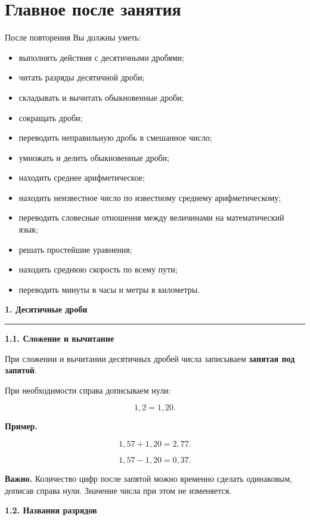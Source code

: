 \documentclass[a4paper,12pt]{article}
\newcommand{\topic}[1]{%
  \vspace{0.7em}
  {\Large\bfseries\color{darkaccent}#1}\par
  \vspace{0.25em}
  {\color{accent}\rule{\linewidth}{0.5pt}}
  \vspace{0.55em}
}
\newcommand{\subtopic}[1]{%
  \vspace{0.4em}
  {\large\bfseries\color{darkaccent}#1}\par
  \vspace{0.15em}
}
\newcommand{\important}[1]{%
  \par
  \vspace{0.25em}
  \noindent
  \textcolor{darkaccent}{\textbf{Важно.}} #1
  \par
}
\newcommand{\exampletitle}{%
  \par
  \vspace{0.3em}
  \noindent
  \textcolor{accent}{\textbf{Пример.}}\enspace
}
\newcommand{\checkitem}{\(\square\)}
\begin{document}
\section*{\textcolor{darkaccent}{Главное после занятия}}

После повторения Вы должны уметь:

\begin{itemize}
  \item[\checkitem] выполнять действия с десятичными дробями;
  \item[\checkitem] читать разряды десятичной дроби;
  \item[\checkitem] складывать и вычитать обыкновенные дроби;
  \item[\checkitem] сокращать дроби;
  \item[\checkitem] переводить неправильную дробь в смешанное число;
  \item[\checkitem] умножать и делить обыкновенные дроби;
  \item[\checkitem] находить среднее арифметическое;
  \item[\checkitem] находить неизвестное число по известному среднему арифметическому;
  \item[\checkitem] переводить словесные отношения между величинами на математический язык;
  \item[\checkitem] решать простейшие уравнения;
  \item[\checkitem] находить среднюю скорость по всему пути;
  \item[\checkitem] переводить минуты в часы и метры в километры.
\end{itemize}

\topic{1. Десятичные дроби}

\subtopic{1.1. Сложение и вычитание}

При сложении и вычитании десятичных дробей числа записываем
\textbf{запятая под запятой}.

При необходимости справа дописываем нули:

\[
1{,}2=1{,}20.
\]

\exampletitle
\[
1{,}57+1{,}20=2{,}77.
\]

\[
1{,}57-1{,}20=0{,}37.
\]

\important{
Количество цифр после запятой можно временно сделать одинаковым,
дописав справа нули. Значение числа при этом не изменяется.
}

\subtopic{1.2. Названия разрядов}
\end{document}
